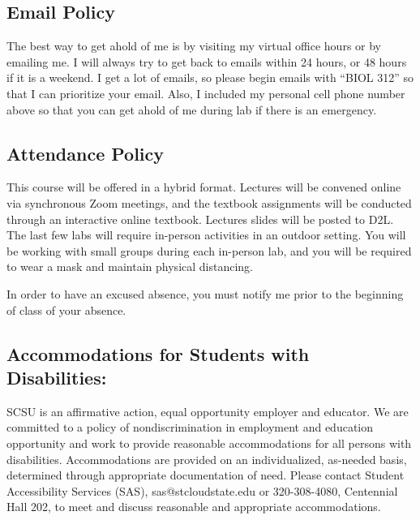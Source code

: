 \documentclass{tufte-handout}
\begin{document}
\begin{fullwidth}
\newpage

\subsection{Email Policy}

 The best way to get ahold of me is by visiting my virtual office hours or by emailing me. I will always try to get back to emails within 24 hours, or 48 hours if it is a weekend. I get a lot of emails, so please begin emails with ``BIOL 312'' so that I can prioritize your email. Also, I included my personal cell phone number above so that you can get ahold of me during lab if there is an emergency.

\subsection{Attendance Policy}

 This course will be offered in a hybrid format. Lectures will be convened online via synchronous Zoom meetings, and the textbook assignments will be conducted through an interactive online textbook. Lectures slides will be posted to D2L. The last few labs will require in-person activities in an outdoor setting. You will be working with small groups during each in-person lab, and you will be required to wear a mask and maintain physical distancing. 


\color{blue}
In order to have an excused absence, you must notify me prior to the beginning of class of your absence.
\color{black}

\subsection{Accommodations for Students with Disabilities: }

SCSU is an affirmative action, equal opportunity employer and educator. We are committed to a policy of nondiscrimination in employment and education opportunity and work to provide reasonable accommodations for all persons with disabilities. Accommodations are provided on an individualized, as-needed basis, determined through appropriate documentation of need. Please contact Student Accessibility Services (SAS), sas@stcloudstate.edu or 320-308-4080, Centennial Hall 202, to meet and discuss reasonable and appropriate accommodations. 


\end{fullwidth}
\end{document}
